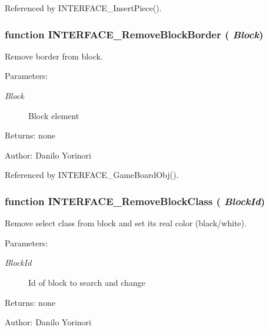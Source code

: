 Referenced by INTERFACE\_\-InsertPiece().
\subsubsection[INTERFACE\_\-RemoveBlockBorder]{\setlength{\rightskip}{0pt plus 5cm}function INTERFACE\_\-RemoveBlockBorder ( {\em Block})}\label{board_8js_3ba5a4549e28b29de373e6b80cfdc5d3}


Remove border from block. 

\begin{Desc}
\item[Parameters:]
\begin{description}
\item[{\em Block}]Block element \end{description}
\end{Desc}
\begin{Desc}
\item[Returns:]none \end{Desc}
\begin{Desc}
\item[Author:]Danilo Yorinori \end{Desc}


Referenced by INTERFACE\_\-GameBoardObj().
\subsubsection[INTERFACE\_\-RemoveBlockClass]{\setlength{\rightskip}{0pt plus 5cm}function INTERFACE\_\-RemoveBlockClass ( {\em BlockId})}\label{board_8js_a03b199b01f4289e1d90e0d22b33b7ff}


Remove select class from block and set its real color (black/white). 

\begin{Desc}
\item[Parameters:]
\begin{description}
\item[{\em BlockId}]Id of block to search and change \end{description}
\end{Desc}
\begin{Desc}
\item[Returns:]none \end{Desc}
\begin{Desc}
\item[Author:]Danilo Yorinori \end{Desc}



